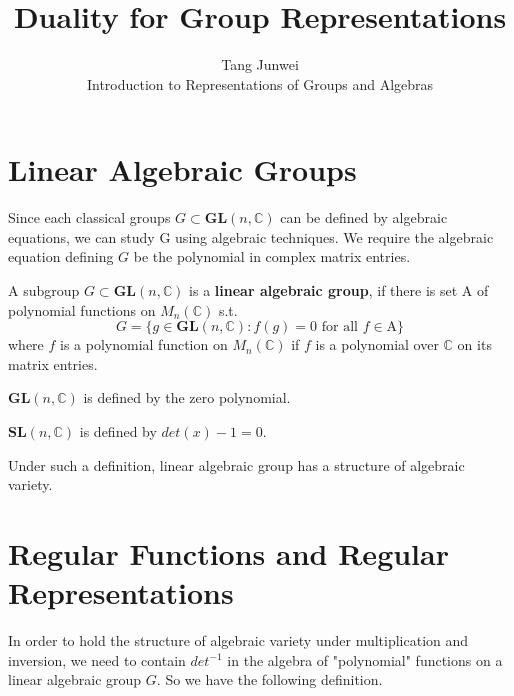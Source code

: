 \documentclass[12pt]{article}
\newenvironment{definition}[2][Definition]{\begin{trivlist}
\item[\hskip \labelsep {\bfseries #1}\hskip \labelsep {\bfseries #2.}]}{\end{trivlist}}
\newenvironment{example}[2][Example]{\begin{trivlist}
\item[\hskip \labelsep {\bfseries #1}\hskip \labelsep {\bfseries #2.}]}{\end{trivlist}}
\begin{document}
\newenvironment{rmk}[2][Remark]{\begin{trivlist}
\item[\hskip \labelsep {\bfseries #1}\hskip \labelsep {\bfseries #2.}]}{\end{trivlist}}
 
\title{Duality for Group Representations}%
\author{Tang Junwei\\ %
Introduction to Representations of Groups and Algebras} %
 
\maketitle
\tableofcontents
\section{Linear Algebraic Groups}
Since each classical groups $G\subset \mathbf{GL}(n,\mathbb{C})$ can be  defined by algebraic equations, we can study G using algebraic techniques. We require the algebraic equation defining $G$ be the polynomial in complex matrix entries.

\begin{definition}{1.1}
A subgroup $G \subset \mathbf{GL} (n,\mathbb{C})$ is a \textbf{linear algebraic group}, if there is set $\mathrm{A}$ of polynomial functions on $M_{n}(\mathbb{C})$ s.t. $$G=\{g \in \mathbf{GL} (n,\mathbb{C}):f(g)=0 \text{ for all } f \in \mathrm{A}\}$$where $f$ is a polynomial function on $M_{n}(\mathbb{C})$ if $f$ is a polynomial over $\mathbb{C}$ on its matrix entries.
\end{definition}

\begin{example}{1.2}
    $\mathbf{GL}(n,\mathbb{C})$ is defined by the zero polynomial.
\end{example}

\begin{example}{1.3}
    $\mathbf{SL}(n,\mathbb{C})$ is defined by $det(x) - 1 =0$.
\end{example}


Under such a definition, linear algebraic group has a structure of algebraic variety.


\section{Regular Functions and Regular Representations}
In order to hold the structure of algebraic variety under multiplication and inversion, we need to contain $det^{-1}$ in the algebra of "polynomial" functions on a linear algebraic group $G$. So we have the following definition.
\end{document}
